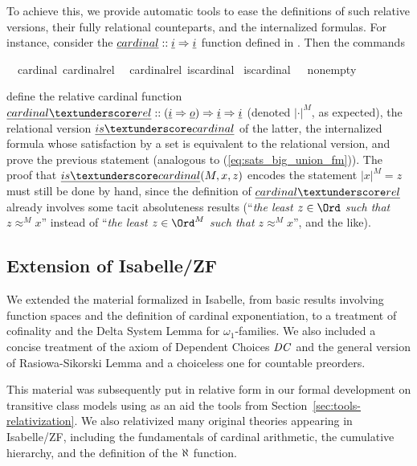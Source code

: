 To achieve this, we provide automatic tools to ease the definitions of
such relative versions, their fully relational counteparts, and the
internalized formulas. For instance, consider the
$\isa{cardinal}::\tyi \fun \tyi$ function defined in
. Then the commands
\begin{isabelle}
  \isamarkupfalse%
  \ \ {\isachardoublequoteopen}cardinal{\isachardoublequoteclose}\ {\isachardoublequoteopen}cardinal{\isacharunderscore}{\kern0pt}rel{\isachardoublequoteclose}\ \isanewline
  \isamarkupfalse%
  \ {\isachardoublequoteopen}cardinal{\isacharunderscore}{\kern0pt}rel{\isachardoublequoteclose}\ {\isachardoublequoteopen}is{\isacharunderscore}{\kern0pt}cardinal{\isachardoublequoteclose}\isanewline
  \isamarkupfalse%
  \ {\isachardoublequoteopen}is{\isacharunderscore}{\kern0pt}cardinal{\isachardoublequoteclose}\ \ \ {\isachardoublequoteopen}nonempty{\isachardoublequoteclose}%
\end{isabelle}
define the relative cardinal function
$\isa{cardinal{\uscore}rel}::(\tyi \fun \tyo) \fun \tyi \fun\tyi$
(denoted  $|\cdot|^M$, as expected),
the relational version $\isa{is{\uscore}cardinal}$ of the latter, the
internalized formula  whose
satisfaction by a set is equivalent to the relational version, and
prove the previous statement (analogous to (\ref{eq:sats_big_union_fm})).
The proof that $\isa{is{\uscore}cardinal}(M,x,z)$  encodes the
statement $|x|^M = z$ must still be done by hand, since the definition
of $\isa{cardinal{\uscore}rel}$ already involves some tacit
absoluteness results (“\textit{the least $z \in \Ord$ such that $z
  \approx^M x$}” instead
of “\textit{the least $z \in \Ord^M$ such that $z
  \approx^M x$}”, and the like).

\subsection{Extension of Isabelle/ZF}
\label{sec:extension-isabellezf}
We extended \cite{Delta_System_Lemma-AFP} the material formalized in
Isabelle, from basic results involving function spaces and the
definition of cardinal exponentiation, to a treatment of cofinality
and the Delta System Lemma for $\omega_1$-families. We also included a
concise treatment of the axiom of Dependent Choices $\mathit{DC}$ and the
general version of Rasiowa-Sikorski Lemma \cite{2018arXiv180705174G}
and a choiceless one for countable preorders.

This material was subsequently put in relative form in our formal
development on transitive class models \cite{Transitive_Models-AFP}
using as an aid the tools from
Section~\ref{sec:tools-relativization}. We also relativized many
original theories appearing in Isabelle/ZF, including the
fundamentals of cardinal arithmetic, the cumulative hierarchy, and the
definition of the $\aleph_{}$ function.


